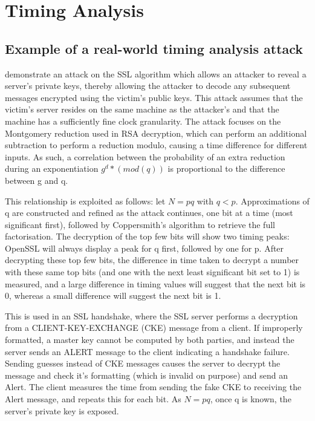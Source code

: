 \documentclass[british,10pt,a4paper]{article}
\begin{document}
\clearpage
\section{Timing Analysis}
\subsection{Example of a real-world timing analysis attack}
\citet{Brumley2005-ez} demonstrate an attack on the SSL algorithm which allows an attacker to reveal a server's private keys, thereby allowing the attacker to decode any subsequent messages encrypted using the victim's public keys. This attack assumes that the victim's server resides on the same machine as the attacker's and that the machine has a sufficiently fine clock granularity. The attack focuses on the Montgomery reduction used in RSA decryption, which can perform an additional subtraction to perform a reduction modulo, causing a time difference for different inputs. As such, a correlation between the probability of an extra reduction during an exponentiation \(g^d * (mod (q))\) is proportional to the difference between g and q.

This relationship is exploited as follows: let $N = pq$ with $q<p$. Approximations of q are constructed and refined as the attack continues, one bit at a time (most significant first), followed by Coppersmith's algorithm to retrieve the full factorisation. The decryption of the top few bits will show two timing peaks: OpenSSL will always display a peak for q first, followed by one for p. After decrypting these top few bits, the difference in time taken to decrypt a number with these same top bits (and one with the next least significant bit set to 1) is measured, and a large difference in timing values will suggest that the next bit is 0, whereas a small difference will suggest the next bit is 1.

This is used in an SSL handshake, where the SSL server performs a decryption from a CLIENT-KEY-EXCHANGE (CKE) message from a client. If improperly formatted, a master key cannot be computed by both parties, and instead the server sends an ALERT message to the client indicating a handshake failure. Sending guesses instead of CKE messages causes the server to decrypt the message and check it's formatting (which is invalid on purpose) and send an Alert. The client measures the time from sending the fake CKE to receiving the Alert message, and repeats this for each bit. As $N=pq$, once q is known, the server's private key is exposed.
\end{document}
